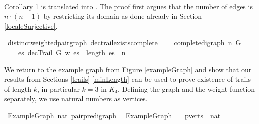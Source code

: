 \begin{isabellebody}
\ \ %
\isadelimproof
%
\endisadelimproof
%
\isatagproof
%
\endisatagproof
{\isafoldproof}%
%
\isadelimproof
%
\endisadelimproof
%
\begin{isamarkuptext}%
Corollary 1 is translated into . The proof first argues
that the number of edges is $n\cdot(n-1)$ by restricting its domain as done already in Section \ref{localeSurjective}.%
\end{isamarkuptext}\isamarkuptrue%
\isamarkupfalse%
{\isacharparenleft}\ distinct{\isacharunderscore}weighted{\isacharunderscore}pair{\isacharunderscore}graph{\isacharparenright}\ dec{\isacharunderscore}trail{\isacharunderscore}exists{\isacharunderscore}complete{\isacharcolon}\ \isanewline
\ \ \ {\isachardoublequoteopen}complete{\isacharunderscore}digraph\ n\ G{\isachardoublequoteclose}\ \isanewline
\ \ \ {\isachardoublequoteopen}{\isacharparenleft}{\isasymexists}\ es{\isachardot}\ decTrail\ G\ w\ es\ {\isasymand}\ length\ es\ {\isacharequal}\ n{\isacharminus}{}{\isacharparenright}{\isachardoublequoteclose}%
\isadelimproof
%
\endisadelimproof
%
\isatagproof
%
\endisatagproof
{\isafoldproof}%
%
\isadelimproof
%
\endisadelimproof
%
\isadelimproof
%
\endisadelimproof
%
\isatagproof
%
\endisatagproof
{\isafoldproof}%
%
\isadelimproof
%
\endisadelimproof
%
\isadelimdocument
%
\endisadelimdocument
%
\isatagdocument
%
\isamarkuptrue%
%
\endisatagdocument
{\isafolddocument}%
%
\isadelimdocument
%
\endisadelimdocument
%
\begin{isamarkuptext}%
We return to the example graph from Figure \ref{exampleGraph} and show that our results from 
Sections \ref{trails}-\ref{minLength} can be used to prove existence of trails of length $k$, in particular
$k = 3$ in $K_4$. Defining the graph and the 
weight function separately, we use natural numbers as vertices.%
\end{isamarkuptext}\isamarkuptrue%
\isamarkupfalse%
\ ExampleGraph{\isacharcolon}{\isacharcolon}\ {\isachardoublequoteopen}nat\ pair{\isacharunderscore}pre{\isacharunderscore}digraph{\isachardoublequoteclose}\ \ \isanewline
{\isachardoublequoteopen}ExampleGraph\ {\isasymequiv}\ {\isacharparenleft}{\isacharbar}\ \isanewline
pverts\ {\isacharequal}\ {\isacharbraceleft}{}{\isacharcomma}{}{\isacharcomma}{}{\isacharcomma}{\isacharparenleft}{}{\isacharcolon}{\isacharcolon}nat{\isacharparenright}{\isacharbraceright}{\isacharcomma}\ \isanewline

\end{isabellebody}
